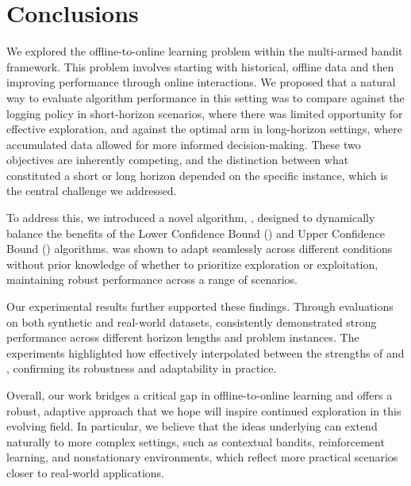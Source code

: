 \section{Conclusions}

We explored the offline-to-online learning problem within the multi-armed bandit framework. This problem involves starting with historical, offline data and then improving performance through online interactions. We proposed that a natural way to evaluate algorithm performance in this setting was to compare against the logging policy in short-horizon scenarios, where there was limited opportunity for effective exploration, and against the optimal arm in long-horizon settings, where accumulated data allowed for more informed decision-making. These two objectives are inherently competing, and the distinction between what constituted a short or long horizon depended on the specific instance, which is the central challenge we addressed.

To address this, we introduced a novel algorithm, \algoname, designed to dynamically balance the benefits of the Lower Confidence Bound (\alglcb) and Upper Confidence Bound (\algucb) algorithms. \algoname was shown to adapt seamlessly across different conditions without prior knowledge of whether to prioritize exploration or exploitation, maintaining robust performance across a range of scenarios. %

Our experimental results further supported these findings. Through evaluations on both synthetic and real-world datasets, \algoname consistently demonstrated strong performance across different horizon lengths and problem instances. The experiments highlighted how \algoname effectively interpolated between the strengths of \alglcb and \algucb, confirming its robustness and adaptability in practice.

Overall, our work bridges a critical gap in offline-to-online learning and offers a robust, adaptive approach that we hope will inspire continued exploration in this evolving field. In particular, we believe that the ideas underlying \algoname can extend naturally to more complex settings, such as contextual bandits, reinforcement learning, and nonstationary environments, which reflect more practical scenarios closer to real-world applications.